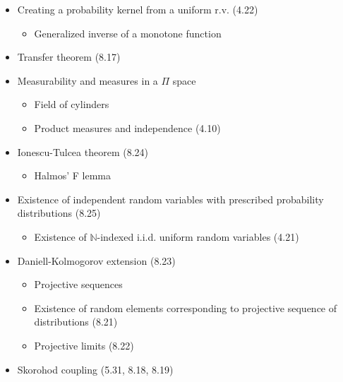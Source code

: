 
\begin{itemize}
	\item Creating a probability kernel from a uniform r.v. (4.22)
	\begin{itemize}
		\item Generalized inverse of a monotone function
	\end{itemize}
	\item Transfer theorem (8.17)
	\item Measurability and measures in a $\Pi$ space
	\begin{itemize}
		\item Field of cylinders
		\item Product measures and independence (4.10)
	\end{itemize}
	\item Ionescu-Tulcea theorem (8.24)
	\begin{itemize}
		\item Halmos' F lemma
	\end{itemize}
	\item Existence of independent random variables with prescribed probability distributions (8.25)
	\begin{itemize}
		\item Existence of $\mathbb{N}$-indexed i.i.d. uniform random variables (4.21)
	\end{itemize}
	\item Daniell-Kolmogorov extension (8.23)
	\begin{itemize}
		\item Projective sequences
		\item Existence of random elements corresponding to projective sequence of distributions (8.21)
		\item Projective limits (8.22)
	\end{itemize}
	\item Skorohod coupling (5.31, 8.18, 8.19)
\end{itemize}